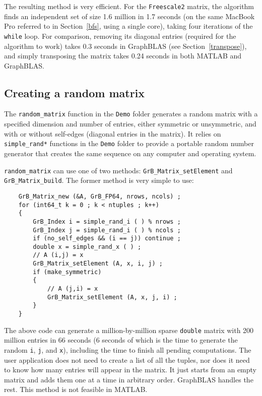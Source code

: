 \documentclass[12pt]{article}
\begin{document}
The resulting method is very efficient.  For the \verb'Freescale2' matrix, the
algorithm finds an independent set of size 1.6 million in 1.7 seconds (on the
same MacBook Pro referred to in Section~\ref{bfs}, using a single core), taking
four iterations of the \verb'while' loop.  For comparison, removing its
diagonal entries (required for the algorithm to work) takes 0.3 seconds in
GraphBLAS (see Section~\ref{transpose}), and simply transposing the matrix
takes 0.24 seconds in both MATLAB and GraphBLAS.

\newpage
\subsection{Creating a random matrix}
\label{random}

The \verb'random_matrix' function in the \verb'Demo' folder generates a random
matrix with a specified dimension and number of entries, either symmetric or
unsymmetric, and with or without self-edges (diagonal entries in the matrix).
It relies on \verb'simple_rand*' functions in the \verb'Demo' folder to provide
a portable random number generator that creates the same sequence on any
computer and operating system.

\verb'random_matrix' can use one of two methods: \verb'GrB_Matrix_setElement'
and \verb'GrB_Matrix_build'.  The former method is very simple to use:

    {\footnotesize
    \begin{verbatim}
    GrB_Matrix_new (&A, GrB_FP64, nrows, ncols) ;
    for (int64_t k = 0 ; k < ntuples ; k++)
    {
        GrB_Index i = simple_rand_i ( ) % nrows ;
        GrB_Index j = simple_rand_i ( ) % ncols ;
        if (no_self_edges && (i == j)) continue ;
        double x = simple_rand_x ( ) ;
        // A (i,j) = x
        GrB_Matrix_setElement (A, x, i, j) ;
        if (make_symmetric)
        {
            // A (j,i) = x
            GrB_Matrix_setElement (A, x, j, i) ;
        }
    } \end{verbatim}}

The above code can generate a million-by-million sparse \verb'double' matrix
with 200 million entries in 66 seconds (6 seconds of which is the time to
generate the random \verb'i', \verb'j', and \verb'x'), including the time
to finish all pending computations.  The user application does not need to
create a list of all the tuples, nor does it need to know how many entries will
appear in the matrix.  It just starts from an empty matrix and adds them one at
a time in arbitrary order.  GraphBLAS handles the rest.  This method is not
feasible in MATLAB.
\end{document}
